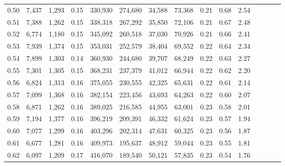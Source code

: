 \begin{tabular}{rrrcrrrrrrrrrrr}
0.50 &   7,437 &   1,293 &                                       0.15 &  330,930 &  274,680 &   34,588 &   73,368 &  0.21 &  0.68 &                         2.54 \\
0.51 &   7,388 &   1,262 &                                       0.15 &  338,318 &  267,292 &   35,850 &   72,106 &  0.21 &  0.67 &                         2.48 \\
0.52 &   6,774 &   1,180 &                                       0.15 &  345,092 &  260,518 &   37,030 &   70,926 &  0.21 &  0.66 &                         2.41 \\
0.53 &   7,939 &   1,374 &                                       0.15 &  353,031 &  252,579 &   38,404 &   69,552 &  0.22 &  0.64 &                         2.34 \\
0.54 &   7,899 &   1,303 &                                       0.14 &  360,930 &  244,680 &   39,707 &   68,249 &  0.22 &  0.63 &                         2.27 \\
0.55 &   7,301 &   1,305 &                                       0.15 &  368,231 &  237,379 &   41,012 &   66,944 &  0.22 &  0.62 &                         2.20 \\
0.56 &   6,824 &   1,313 &                                       0.16 &  375,055 &  230,555 &   42,325 &   65,631 &  0.22 &  0.61 &                         2.14 \\
0.57 &   7,099 &   1,368 &                                       0.16 &  382,154 &  223,456 &   43,693 &   64,263 &  0.22 &  0.60 &                         2.07 \\
0.58 &   6,871 &   1,262 &                                       0.16 &  389,025 &  216,585 &   44,955 &   63,001 &  0.23 &  0.58 &                         2.01 \\
0.59 &   7,194 &   1,377 &                                       0.16 &  396,219 &  209,391 &   46,332 &   61,624 &  0.23 &  0.57 &                         1.94 \\
0.60 &   7,077 &   1,299 &                                       0.16 &  403,296 &  202,314 &   47,631 &   60,325 &  0.23 &  0.56 &                         1.87 \\
0.61 &   6,677 &   1,281 &                                       0.16 &  409,973 &  195,637 &   48,912 &   59,044 &  0.23 &  0.55 &                         1.81 \\
0.62 &   6,097 &   1,209 &                                       0.17 &  416,070 &  189,540 &   50,121 &   57,835 &  0.23 &  0.54 &                         1.76 \\

\end{tabular}
